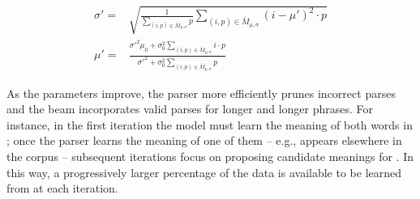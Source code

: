 \begin{align}
	\sigma' =& \sqrt{
		\frac{ 1 } { \sum\limits_{(i,p) \in \bar M_{\mu,\sigma}}  p }
		\sum\limits_{(i,p) \in \bar M_{\mu,\sigma}} (i-\mu')^2 \cdot p
	} \\
	\mu' =&
		\frac{
			\sigma'^2 \mu_0 + \sigma_0^2 \sum_{(i,p) \in \bar M_{\mu,\sigma}}  i \cdot p
		}{
			\sigma'^2 + \sigma_0^2 \sum_{(i,p) \in \bar M_{\mu,\sigma}} p 
		}
\label{eqn:gaussianEM}
\end{align}

As the parameters improve, the parser more efficiently prunes incorrect parses
	and the beam incorporates valid parses for longer and longer phrases.
For instance, in the first iteration the model must learn the meaning of both
	words in ; once the parser learns the meaning of one of them
	-- e.g.,  appears elsewhere in the corpus -- subsequent iterations
	focus on proposing candidate meanings for .
In this way, a progressively larger percentage of the data is available to be
	learned from at each iteration.

%
%

